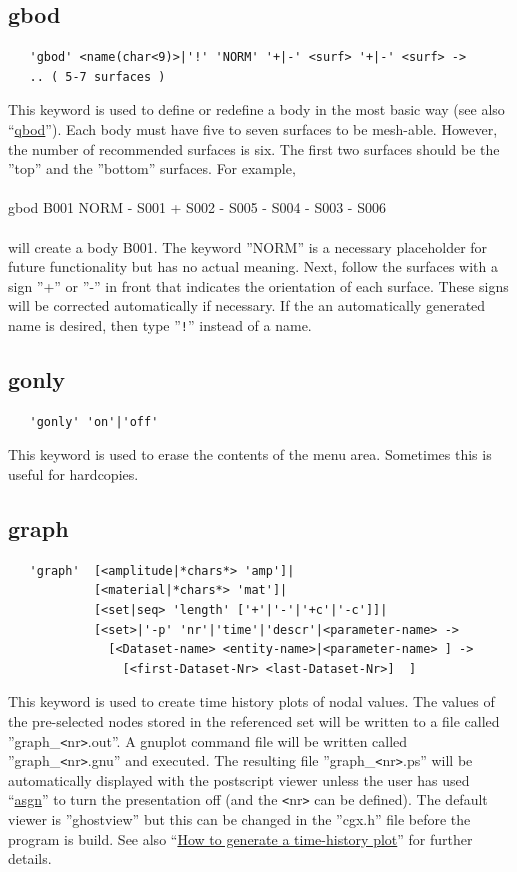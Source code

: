 \documentclass{article}
\providecommand{\htmlref}[2]{\hyperref[#2]{#1}}
\begin{document}
\subsection{\label{gbod}gbod}
\begin{verbatim}
   'gbod' <name(char<9)>|'!' 'NORM' '+|-' <surf> '+|-' <surf> ->
   .. ( 5-7 surfaces )
\end{verbatim}
This keyword is used to define or redefine a body in the most basic way (see also ``\htmlref{qbod}{qbod}''). Each body must have five to seven surfaces to be mesh-able. However, the number of recommended surfaces is six. The first two surfaces should be the ''top'' and the ''bottom'' surfaces. For example,\\\\gbod B001 NORM - S001 + S002 - S005 - S004 - S003 - S006\\\\will create a body B001. The keyword ''NORM'' is a necessary placeholder for future functionality but has no actual meaning. Next, follow the surfaces with a sign ''+'' or ''-'' in front that indicates the orientation of each surface. These signs will be corrected automatically if necessary. If the an automatically generated name is desired, then type ''\verb_!_'' instead of a name.

\subsection{\label{gonly}gonly}
\begin{verbatim}
   'gonly' 'on'|'off' 
\end{verbatim}
This keyword is used to erase the contents of the menu area. Sometimes this is useful for hardcopies.

\subsection{\label{graph}graph}
\begin{verbatim}
   'graph'  [<amplitude|*chars*> 'amp']|
            [<material|*chars*> 'mat']|
            [<set|seq> 'length' ['+'|'-'|'+c'|'-c']]| 
            [<set>|'-p' 'nr'|'time'|'descr'|<parameter-name> ->
              [<Dataset-name> <entity-name>|<parameter-name> ] ->
                [<first-Dataset-Nr> <last-Dataset-Nr>]  ]
\end{verbatim}
This keyword is used to create time history plots of nodal values. The values of the pre-selected nodes stored in the referenced set will be written to a file called ''graph\_\verb_<_nr\verb_>_.out''. A gnuplot command file will be written called ''graph\_\verb_<_nr\verb_>_.gnu'' and executed. The resulting file ''graph\_\verb_<_nr\verb_>_.ps'' will be automatically displayed with the postscript viewer unless the user has used ``\htmlref{asgn}{asgn}'' to turn the presentation off (and the \verb_<_nr\verb_>_ can be defined). The default viewer is ''ghostview'' but this can be changed in the ''cgx.h'' file before the program is build. See also ``\htmlref{How to generate a time-history plot}{How to generate a time-history plot}'' for further details.
\end{document}
